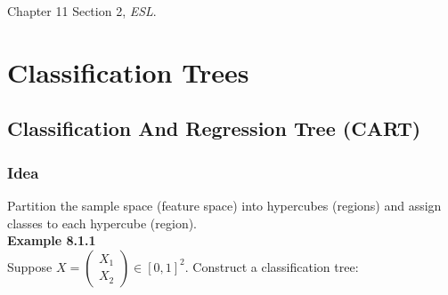 \documentclass[12pt]{book}
\theoremstyle{definition}
\theoremstyle{remark}
\begin{document}
\begin{referencebox}
    Chapter 11 Section 2, \textit{ESL}.
\end{referencebox}







\chapter{Classification Trees}
\section{Classification And Regression Tree (CART)}

\subsection{Idea}

Partition the sample space (feature space) into hypercubes (regions) and assign classes to each hypercube (region).\\


\textbf{Example 8.1.1}\\
Suppose $X = \begin{pmatrix}
    X_1\\X_2
\end{pmatrix} \in [0,1]^2$. Construct a classification tree:\\
\end{document}

